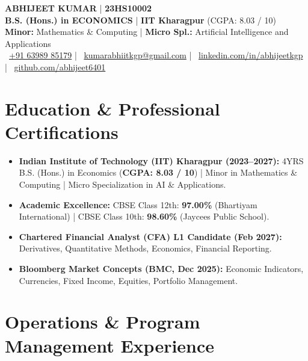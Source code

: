 \documentclass[10pt, a4paper]{article}
\begin{document}
\begin{center}
  {\LARGE \textbf{ABHIJEET KUMAR}} \quad | \quad \textbf{23HS10002} \\[3pt]
  \textbf{B.S. (Hons.) in ECONOMICS} \quad | \quad \textbf{IIT Kharagpur} (CGPA: 8.03 / 10) \\[2pt]
  \small \textbf{Minor:} Mathematics \& Computing \quad | \quad \textbf{Micro Spl.:} Artificial Intelligence and Applications \\[3pt]
  \small
  \faPhone\ \href{tel:+916398985179}{+91 63989 85179} \quad | \quad
  \faEnvelope\ \href{mailto:kumarabhiitkgp@gmail.com}{kumarabhiitkgp@gmail.com} \quad | \quad
  \faLinkedin\ \href{https://linkedin.com/in/abhijeetkgp}{linkedin.com/in/abhijeetkgp} \quad | \quad
  \faGithub\ \href{https://github.com/abhijeet6401}{github.com/abhijeet6401}
\end{center}

\vspace{-4pt}

\section{Education \& Professional Certifications}
\begin{itemize}[leftmargin=1.2em, itemsep=0.5pt, parsep=0pt, topsep=1pt]
  \small
  \item \textbf{Indian Institute of Technology (IIT) Kharagpur (2023--2027):} 4YRS B.S. (Hons.) in Economics (\textbf{CGPA: 8.03 / 10}) | Minor in Mathematics \& Computing | Micro Specialization in AI \& Applications.
  \item \textbf{Academic Excellence:} CBSE Class 12th: \textbf{97.00\%} (Bhartiyam International) | CBSE Class 10th: \textbf{98.60\%} (Jaycees Public School).
  \item \textbf{Chartered Financial Analyst (CFA) L1 Candidate (Feb 2027):} Derivatives, Quantitative Methods, Economics, Financial Reporting.
  \item \textbf{Bloomberg Market Concepts (BMC, Dec 2025):} Economic Indicators, Currencies, Fixed Income, Equities, Portfolio Management.
\end{itemize}

\vspace{-2pt}

\section{Operations \& Program Management Experience}
\end{document}
